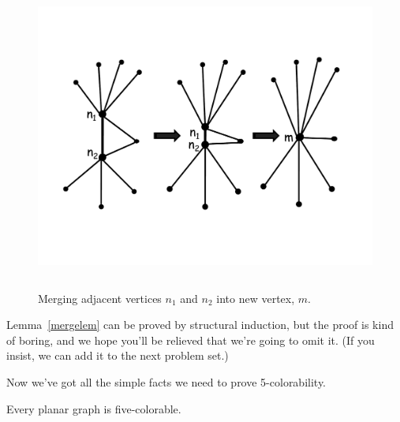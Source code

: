 \begin{figure}%
\centering \includegraphics[height=4in]{figures/vertex-merge-arrows.pdf}
\caption{Merging adjacent vertices $n_1$ and $n_2$ into new vertex, $m$.}
\label{fig:merged}
\end{figure}

Lemma~\ref{mergelem} can be proved by structural induction, but the proof
is kind of boring, and we hope you'll be relieved that we're going to omit
it.  (If you insist, we can add it to the next problem set.)

Now we've got all the simple facts we need to prove 5-colorability.
\begin{theorem}
Every planar graph is five-colorable.
\end{theorem}

